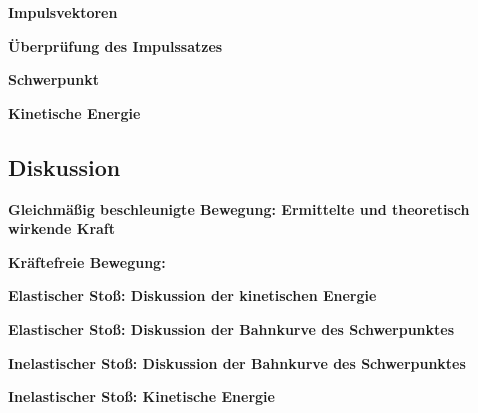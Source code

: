 \documentclass{article}
\begin{document}
\textbf{Impulsvektoren}

\textbf{Überprüfung des Impulssatzes}

\textbf{Schwerpunkt}

\textbf{Kinetische Energie}




\subsection{Diskussion}
\textbf{Gleichmäßig beschleunigte Bewegung: Ermittelte und theoretisch wirkende Kraft}


\textbf{Kräftefreie Bewegung: }


\textbf{Elastischer Stoß: Diskussion der kinetischen Energie}

\textbf{Elastischer Stoß: Diskussion der Bahnkurve des Schwerpunktes}


\textbf{Inelastischer Stoß: Diskussion der Bahnkurve des Schwerpunktes}

\textbf{Inelastischer Stoß: Kinetische Energie}
\end{document}
